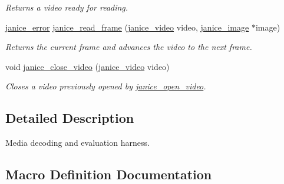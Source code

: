 \begin{DoxyCompactItemize}
\begin{DoxyCompactList}\small\item\em Returns a video ready for reading. \end{DoxyCompactList}\item 
\hyperlink{group__janice_ga4873d49c1f9d6a6880dfbd485cf6ba72}{janice\+\_\+error} \hyperlink{group__janice__io_gae0bc9ecbd8d16aa8e9c8483844b64140}{janice\+\_\+read\+\_\+frame} (\hyperlink{group__janice__io_ga01c80201c1ce11f8c7a52cf9493b3ee2}{janice\+\_\+video} video, \hyperlink{structjanice__image}{janice\+\_\+image} $\ast$image)
\begin{DoxyCompactList}\small\item\em Returns the current frame and advances the video to the next frame. \end{DoxyCompactList}\item 
void \hyperlink{group__janice__io_ga48b8438cfe4cfe35a3b2978c01c6df6e}{janice\+\_\+close\+\_\+video} (\hyperlink{group__janice__io_ga01c80201c1ce11f8c7a52cf9493b3ee2}{janice\+\_\+video} video)
\begin{DoxyCompactList}\small\item\em Closes a video previously opened by \hyperlink{group__janice__io_ga279c7c207337e0cec2272090583668e0}{janice\+\_\+open\+\_\+video}. \end{DoxyCompactList}\end{DoxyCompactItemize}


\subsection{Detailed Description}
Media decoding and evaluation harness. 



\subsection{Macro Definition Documentation}
\hypertarget{group__janice__io_ga39a97708cd80add78fa1fccf8b23c6f3}{}
